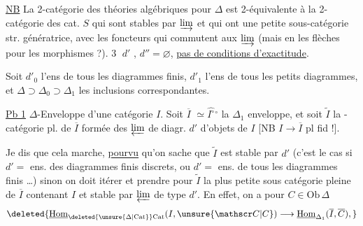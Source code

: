 \uline{NB} La 2-catégorie des théories algébriques pour $\Delta$ est 2-équivalente à la 2-catégorie des cat. $S$ qui sont stables par  $\varinjlim$  et qui ont une petite sous-catégorie str. génératrice, avec les foncteurs qui commutent aux $\varinjlim$ (mais en  les flèches pour les morphismes ?). 
\textcircled{3}  $d'$  , $d''=\varnothing$, \uline{pas de conditions d'exactitude}.

 Soit $d'_0$ l'ens de tous les diagrammes finis, $d'_1$ l'ens de tous les petits diagrammes, et $\Delta\supset\Delta_0\supset\Delta_1$ les inclusions correspondantes.

\uline{Pb 1} $\Delta$-Enveloppe  d'une catégorie $I$. Soit $\overline I$  $\simeq\widehat{I^\circ}{}^\circ$ la $\Delta_1$ enveloppe, et soit $\widetilde I$ la -catégorie pl. de $\overline I$ formée des $\varprojlim$ de diagr. $d'$ d'objets de $I$ [NB $I\longrightarrow\overline I$ pl fid !].

Je dis que cela marche, \uline{pourvu} qu'on sache que $\widetilde I$ est stable par $d'$ (c'est le cas si $d'=$ ens. des diagrammes finis discrets, ou $d'=$ ens. de tous les diagrammes finis \inserted{(!)} \ldots) sinon on doit itérer et prendre  pour $\widetilde I$ la plus petite sous catégorie  pleine de $\overline I$ contenant $I$ et stable par $\varprojlim$ de type $d'$. En effet, on a pour $C\in\mathrm{Ob}\,\Delta$
\[
\deleted{\underline{\mathrm{Hom}}_{\deleted{\unsure{\Delta|\mathrm{Cat}}}\mathrm{Cat}}(I,\unsure{\mathscr C|C})\longrightarrow\underline{\mathrm{Hom}}_{\Delta_1}(\overline I,\overline C),}
\]

